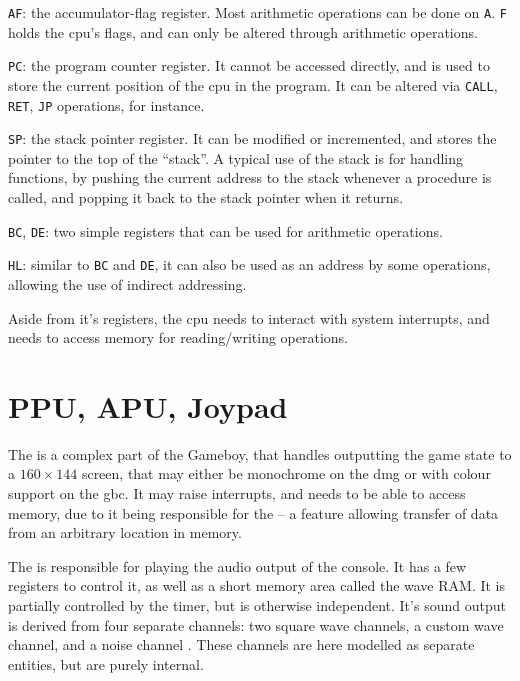 \documentclass[11pt]{informatics-report}
\begin{document}
\begin{compactitem}
	\item \texttt{AF}: the accumulator-flag register. Most arithmetic operations can be done on \texttt{A}. \texttt{F} holds the \gls{cpu}'s flags, and can only be altered through arithmetic operations.
	\item \texttt{PC}: the program counter register. It cannot be accessed directly, and is used to store the current position of the \gls{cpu} in the program. It can be altered via \texttt{CALL}, \texttt{RET}, \texttt{JP} operations, for instance.
	\item \texttt{SP}: the stack pointer register. It can be modified or incremented, and stores the pointer to the top of the ``stack''. A typical use of the stack is for handling functions, by pushing the current address to the stack whenever a procedure is called, and popping it back to the stack pointer when it returns.
	\item \texttt{BC}, \texttt{DE}: two simple registers that can be used for arithmetic operations.
	\item \texttt{HL}: similar to \texttt{BC} and \texttt{DE}, it can also be used as an address by some operations, allowing the use of indirect addressing.
\end{compactitem}

Aside from it's registers, the \gls{cpu} needs to interact with system interrupts, and needs to access memory for reading/writing operations.

\section{PPU, APU, Joypad}

The  is a complex part of the Gameboy, that handles outputting the game state to a $160 \times 144$ screen, that may either be monochrome on the \gls{dmg} or with colour support on the \gls{gbc}. It may raise interrupts, and needs to be able to access memory, due to it being responsible for the  -- a feature allowing transfer of data from an arbitrary location in memory.

The  is responsible for playing the audio output of the console. It has a few registers to control it, as well as a short memory area called the wave RAM. It is partially controlled by the timer, but is otherwise independent. It's sound output is derived from four separate channels: two square wave channels, a custom wave channel, and a noise channel \cite[Audio]{pandoc}. These channels are here modelled as separate entities, but are purely internal.
\end{document}
